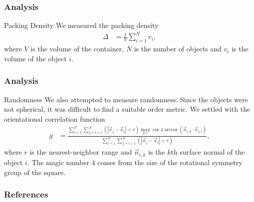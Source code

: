 \documentclass[sumlimits, intlimits]{beamer}
\begin{document}
\begin{frame}
\frametitle{Analysis}
\begin{block}{Packing Density}
We measured the packing density
\begin{align*}
\Delta & = \frac 1 V \sum_{i = 1}^N v_i,
\end{align*}
where $V$ is the volume of the container,
$N$ is the number of objects and
$v_i$ is the volume of the object $i$.
\end{block}
\end{frame}

\begin{frame}
\frametitle{Analysis}
\begin{block}{Randomness}
We also attempted to measure randomness.
Since the objects were not spherical,
it was difficult to find a suitable order metric.
We settled with the orientational correlation function
\begin{align*}
g & = \frac{\sum_{i = 1}^N \sum_{j = i + 1}^N (|\vec x_j - \vec x_i| < r) \max_{k, l} \cos 4 \arccos (\vec n_{i, k} \cdot \vec n_{j, l})}
{\sum_{i = 1}^N \sum_{j = i + 1}^N (|\vec x_j - \vec x_i| < r)},
\end{align*}
where $r$ is the nearest-neighbor range and
$\vec n_{i, k}$ is the $k$th surface normal of the object $i$.
The magic number $4$ comes from the size of the rotational symmetry group of the square.
\end{block}
\end{frame}

\begin{frame}
\frametitle{References}
\printbibliography
\end{frame}
\end{document}

